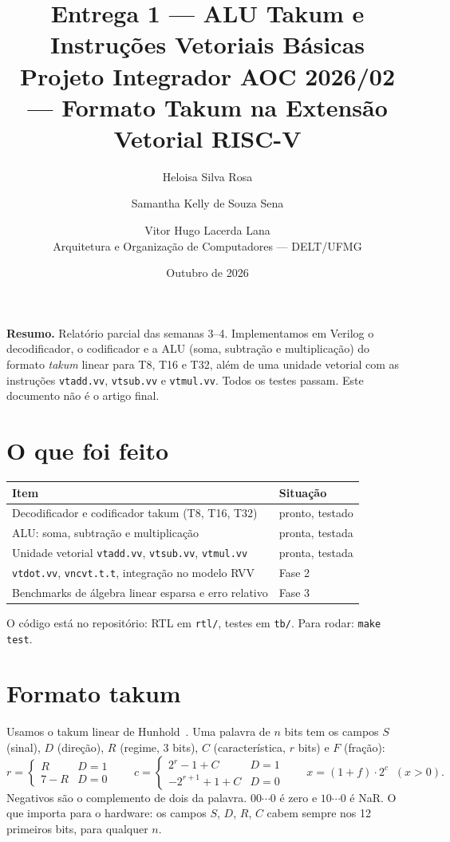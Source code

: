\documentclass[11pt,a4paper]{article}
\title{\textbf{Entrega 1 --- ALU Takum e Instruções Vetoriais Básicas}\\[4pt]
\large Projeto Integrador AOC 2026/02 --- Formato Takum na Extensão Vetorial RISC-V}
\author{%
  Heloisa Silva Rosa \and Samantha Kelly de Souza Sena \and Vitor Hugo Lacerda Lana\\[4pt]
  \small Arquitetura e Organização de Computadores --- DELT/UFMG}
\date{Outubro de 2026}
\newcommand{\code}[1]{\texttt{#1}}
\begin{document}
\maketitle

\noindent\textbf{Resumo.} Relatório parcial das semanas 3--4. Implementamos em Verilog o decodificador,
o codificador e a ALU (soma, subtração e multiplicação) do formato \emph{takum} linear para T8, T16 e T32,
além de uma unidade vetorial com as instruções \code{vtadd.vv}, \code{vtsub.vv} e \code{vtmul.vv}.
Todos os testes passam. Este documento não é o artigo final.

\section{O que foi feito}

\begin{table}[H]
\centering
\begin{tabularx}{\linewidth}{Xl}
\toprule
Item & Situação \\
\midrule
Decodificador e codificador takum (T8, T16, T32) & pronto, testado \\
ALU: soma, subtração e multiplicação & pronta, testada \\
Unidade vetorial \code{vtadd.vv}, \code{vtsub.vv}, \code{vtmul.vv} & pronta, testada \\
\code{vtdot.vv}, \code{vncvt.t.t}, integração no modelo RVV & Fase 2 \\
Benchmarks de álgebra linear esparsa e erro relativo & Fase 3 \\
\bottomrule
\end{tabularx}
\end{table}

O código está no repositório: RTL em \code{rtl/}, testes em \code{tb/}. Para rodar: \code{make test}.

\section{Formato takum}

Usamos o takum linear de Hunhold~\cite{hunhold2024takum}. Uma palavra de $n$ bits tem os campos
$S$ (sinal), $D$ (direção), $R$ (regime, 3 bits), $C$ (característica, $r$ bits) e $F$ (fração):
\[
r = \begin{cases} R & D=1\\ 7-R & D=0 \end{cases}
\qquad
c = \begin{cases} 2^r - 1 + C & D=1\\ -2^{r+1} + 1 + C & D=0 \end{cases}
\qquad
x = (1 + f)\cdot 2^{c} \;\; (x > 0).
\]
Negativos são o complemento de dois da palavra. $00\cdots0$ é zero e $10\cdots0$ é NaR.
O que importa para o hardware: os campos $S$, $D$, $R$, $C$ cabem sempre nos 12 primeiros bits,
para qualquer $n$.
\end{document}
